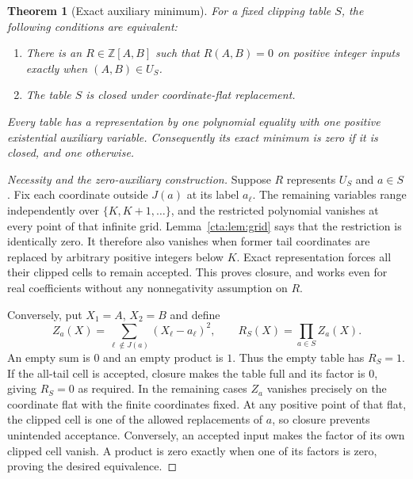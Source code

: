 \documentclass[11pt]{article}
\newtheorem{theorem}{Theorem}[section]
\theoremstyle{definition}
\theoremstyle{remark}
\begin{document}
\begin{theorem}[Exact auxiliary minimum]\label{cta:thm:classification}
For a fixed clipping table $S$, the following conditions are equivalent:
\begin{enumerate}[label=(\roman*)]
\item There is an $R\in\mathbb Z[A,B]$ such that $R(A,B)=0$ on positive
integer inputs exactly when $(A,B)\in U_S$.
\item The table $S$ is closed under coordinate-flat replacement.
\end{enumerate}
Every table has a representation by one polynomial equality with one
positive existential auxiliary variable. Consequently its exact minimum
is zero if it is closed, and one otherwise.
\end{theorem}
\begin{proof}[Necessity and the zero-auxiliary construction]
Suppose $R$ represents $U_S$ and $a\in S$. Fix each coordinate outside
$J(a)$ at its label $a_\ell$. The remaining variables range independently
over $\{K,K+1,\ldots\}$, and the restricted polynomial vanishes at every
point of that infinite grid. Lemma~\ref{cta:lem:grid} says that the restriction
is identically zero. It therefore also vanishes when former tail
coordinates are replaced by arbitrary positive integers below $K$.
Exact representation forces all their clipped cells to remain accepted.
This proves closure, and works even for real coefficients without any
nonnegativity assumption on $R$.

Conversely, put $X_1=A$, $X_2=B$ and define
\begin{equation}\label{cta:eq:zeropoly}
 Z_a(X)=\sum_{\ell\notin J(a)}(X_\ell-a_\ell)^2,
 \qquad R_S(X)=\prod_{a\in S}Z_a(X).
\end{equation}
An empty sum is $0$ and an empty product is $1$. Thus the empty table
has $R_S=1$. If the all-tail cell is accepted, closure makes the table
full and its factor is $0$, giving $R_S=0$ as required.
In the remaining cases $Z_a$ vanishes precisely on the coordinate flat
with the finite coordinates fixed. At any positive point of that flat,
the clipped cell is one of the allowed replacements of $a$, so closure
prevents unintended acceptance. Conversely, an accepted input makes the
factor of its own clipped cell vanish. A product is zero exactly when
one of its factors is zero, proving the desired equivalence.
\end{proof}
\end{document}
